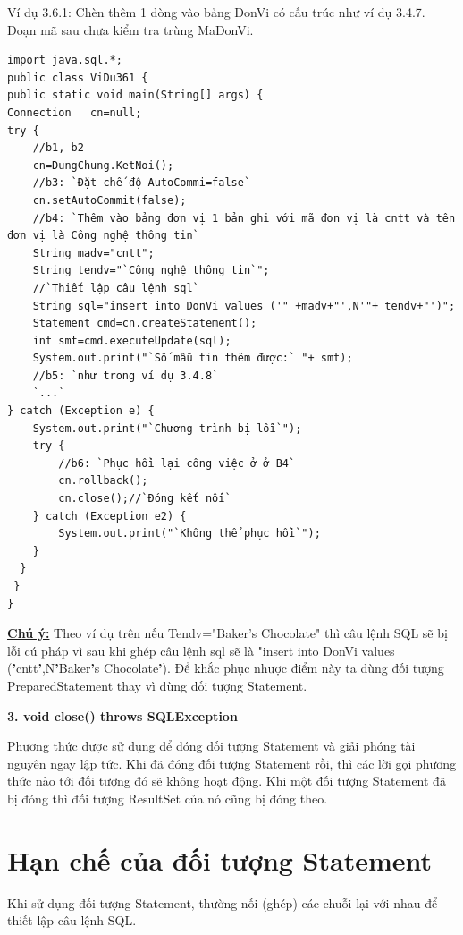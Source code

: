 Ví dụ 3.6.1: Chèn thêm 1 dòng vào bảng DonVi có cấu trúc như ví dụ 3.4.7. Đoạn mã sau chưa kiểm tra trùng MaDonVi.
\begin{lstlisting}[escapechar=`]
import java.sql.*;
public class ViDu361 {
public static void main(String[] args) {
Connection   cn=null;
try { 
	//b1, b2
	cn=DungChung.KetNoi();
	//b3: `Đặt chế độ AutoCommi=false`
	cn.setAutoCommit(false);
	//b4: `Thêm vào bảng đơn vị 1 bản ghi với mã đơn vị là cntt và tên đơn vị là Công nghệ thông tin`
	String madv="cntt";
	String tendv="`Công nghệ thông tin`";
	//`Thiết lập câu lệnh sql`
	String sql="insert into DonVi values ('" +madv+"',N'"+ tendv+"')";
	Statement cmd=cn.createStatement();
	int smt=cmd.executeUpdate(sql);
	System.out.print("`Số mẫu tin thêm được:` "+ smt);
	//b5: `như trong ví dụ 3.4.8`
	`...`
} catch (Exception e) {
	System.out.print("`Chương trình bị lỗi`");
	try { 
		//b6: `Phục hồi lại công việc ở ở B4`
		cn.rollback();
		cn.close();//`Đóng kết nối`
	} catch (Exception e2) {
		System.out.print("`Không thể phục hồi`");
	}
  }
 }
}
\end{lstlisting}

\textbf{\underline{Chú ý:}} Theo ví dụ trên nếu Tendv="Baker's Chocolate" thì câu lệnh SQL sẽ bị lỗi cú pháp vì sau khi ghép câu lệnh sql sẽ là "insert into DonVi values (\textbf{'}cntt\textbf{'},N\textbf{'}Baker\textbf{'}s Chocolate\textbf{'}). Để khắc phục nhược điểm này ta dùng đối tượng PreparedStatement thay vì dùng đối tượng Statement.

\textbf{3. void close() throws SQLException}

Phương thức được sử dụng để đóng đối tượng Statement và giải phóng tài nguyên ngay lập tức. Khi đã đóng đối tượng Statement rồi, thì các lời gọi phương thức nào tới đối tượng đó sẽ không hoạt động. Khi một đối tượng Statement đã bị đóng thì đối tượng ResultSet của nó cũng bị đóng theo.

\section{Hạn chế của đối tượng Statement}
Khi sử dụng đối tượng Statement, thường nối (ghép) các chuỗi lại với nhau để thiết lập câu lệnh SQL. 

